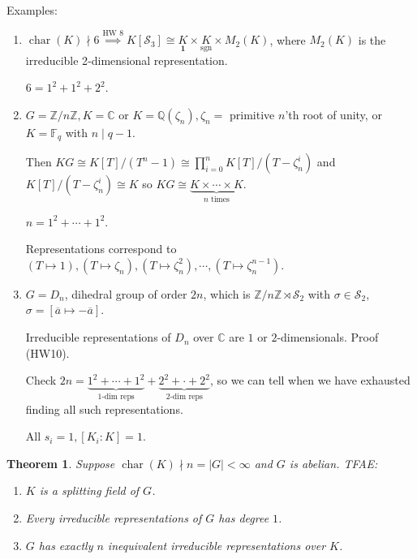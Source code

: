 \documentclass{article}
\theoremstyle{definition}
\theoremstyle{plain}
\newtheorem{theorem}{Theorem}[section]
\theoremstyle{remark}
\begin{document}
    Examples:

    \begin{enumerate}[label=\arabic*)]
        \item \(\operatorname{char}(K) \nmid 6 \overset{\text{HW 8}}{\implies} K[\mathscr{S}_3] \cong \underset{\textbf{1}}{K} \times \underset{\text{sgn}}{K} \times M_2(K)\), where \(M_2(K)\) is the irreducible 2\(\)-dimensional representation.
        
        \(6 = 1^2 + 1^2 + 2^2\).
        
        \item \(G = \mathbb{Z} / n\mathbb{Z}, K = \mathbb{C} \text{ or } K = \mathbb{Q}(\zeta_n), \zeta_n =\) primitive \(n\)'th root of unity, or \(K = \mathbb{F}_q\) with \(n\mid q-1\).
        
        Then \(KG \cong K[T] / (T^n - 1) \cong \prod_{i=0}^{n} K[T] / (T - \zeta_n^i)\) and \(K[T] / (T - \zeta_n^i) \cong K\) so \(KG \cong \underbrace{K \times \cdots \times K}_{n \text{ times}}\).
        
        \(n = 1^2 + \cdots + 1^2\).

        Representations correspond to \((T \mapsto 1), (T \mapsto \zeta_n) , (T \mapsto \zeta_n^2) , \cdots , (T \mapsto \zeta_n^{n-1})\).

        \item \(G = D_n\), dihedral group of order \(2n\), which is \(\mathbb{Z} / n\mathbb{Z}  \rtimes \mathscr{S}_2\) with \(\sigma \in \mathscr{S}_2\), \(\sigma = [\overline{a} \mapsto -\overline{a}]\).
        
        Irreducible representations of \(D_n\) over \(\mathbb{C}\) are \(1\) or \(2\)-dimensionals. Proof (HW10).
        
        Check \(2n = \underbrace{1^2 + \cdots + 1^2}_{1\text{-dim  reps}} + \underbrace{2^2 + \cdot + 2^2}_{2\text{-dim reps}}\), so we can tell when we have exhausted finding all such representations. 

        All \(s_i = 1, [K_i : K] = 1\).
    \end{enumerate} 

    \begin{theorem}
        Suppose \(\operatorname{char}(K) \nmid n = \vert G \vert < \infty\) and \(G\) is abelian. TFAE:

        \begin{enumerate}[label=\roman*)]
            \item \(K\) is a splitting field of \(G\).
            \item Every irreducible representations of \(G\) has degree \(1\).
            \item \(G\) has exactly \(n\) inequivalent irreducible representations over \(K\). 
        \end{enumerate} 
    \end{theorem}
\end{document}
